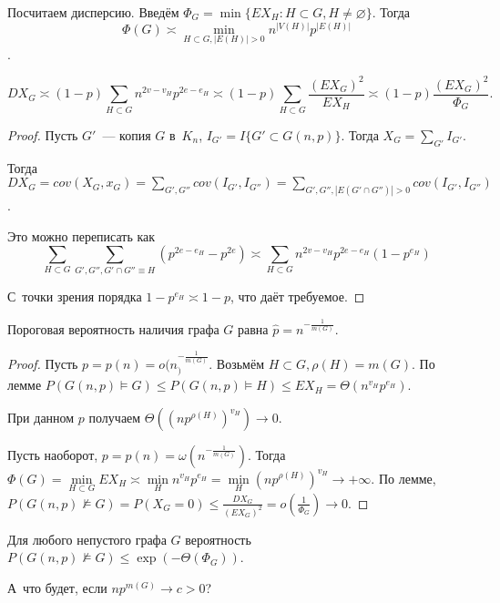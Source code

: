 \documentclass{article}
\begin{document}
Посчитаем дисперсию. Введём $\Phi_G = \min\{ EX_H: H \subset G, H \ne
\varnothing \}$. Тогда
$$\Phi(G) \asymp \min\limits_{H \subset G, |E(H)| > 0} n^{|V(H)|} p^{|E(H)|}$$.

\begin{lemma}
	$$DX_G \asymp (1 - p) \sum\limits_{H \subset G} n^{2v - v_H} p^{2e - e_H}
	\asymp (1 - p) \sum\limits_{H \subset G} \frac{(EX_G)^2}{EX_H} \asymp (1 - p)
	\frac{(EX_G)^2}{\Phi_G}.$$
\end{lemma}
\begin{proof}
	Пусть $G'$~--- копия $G$ в~$K_n$, $I_{G'} = I\{G' \subset G(n, p)\}$. Тогда
	$X_G = \sum\limits_{G'} I_{G'}$.

	Тогда $DX_G = cov(X_G, x_G) = \sum\limits_{G', G''} cov(I_{G'}, I_{G''}) =
	\sum\limits_{G', G'', |E(G' \cap G'')| > 0} cov(I_{G'}, I_{G''})$.

	Это можно переписать как
	$$\sum\limits_{H \subset G} \sum\limits_{G', G'', G'
	\cap G'' \equiv H} (p^{2e - e_H} - p^{2e}) \asymp \sum\limits_{H \subset G}
	n^{2v-v_H}p^{2e - e_H}(1 - p^{e_H})$$

	С~точки зрения порядка $1 - p^{e_H} \asymp 1 - p$, что даёт требуемое.
\end{proof}

\begin{theorem}
	Пороговая вероятность наличия графа $G$ равна $\hat{p} = n^{-\frac{1}{m(G)}}$.
\end{theorem}
\begin{proof}
	Пусть $p = p(n) = o(n^{-\frac{1}{m(G)}}_)$. Возьмём $H \subset G, \rho(H) =
	m(G)$. По лемме $P(G(n, p) \models G) \le P(G(n, p) \models H) \le EX_H =
	\Theta(n^{v_H} p^{e_H})$.

	При данном $p$ получаем $\Theta((np^{\rho(H)})^{v_H}) \rightarrow 0$.

	Пусть наоборот, $p = p(n) = \omega(n^{-\frac{1}{m(G)}})$. Тогда $\Phi(G) =
	\min\limits_{H \subset G} EX_H \asymp \min\limits_H n^{v_H} p^{e_H} =
	\min\limits_H (np^{\rho(H)})^{v_H} \rightarrow +\infty$. По лемме, $P(G(n, p)
	\not\models G) = P(X_G = 0) \le \frac{DX_G}{(EX_G)^2} = o(\frac{1}{\Phi_G})
	\rightarrow 0$.
\end{proof}

\begin{theorem}
	Для любого непустого графа $G$ вероятность $P(G(n, p) \not\models G) \le
	\exp(-\Theta(\Phi_G))$.
\end{theorem}

А~что будет, если $n p^{m(G)} \rightarrow c > 0$?
\end{document}
